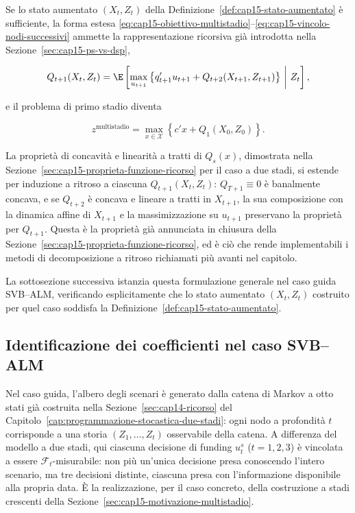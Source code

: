 Se lo stato aumentato $(X_t,Z_t)$ della
Definizione~\ref{def:cap15-stato-aumentato} \`e sufficiente, la forma estesa
\eqref{eq:cap15-obiettivo-multistadio}--\eqref{eq:cap15-vincolo-nodi-successivi}
ammette la rappresentazione ricorsiva gi\`a introdotta nella
Sezione~\ref{sec:cap15-ps-vs-dsp},

\[
Q_{t+1}(X_t,Z_t)
=
\E
\left[
\max_{u_{t+1}}
\left\{
q_{t+1}'u_{t+1}
+
Q_{t+2}(X_{t+1},Z_{t+1})
\right\}
\ \middle|\
Z_t
\right],
\]

e il problema di primo stadio diventa

\[
z^{\text{multistadio}}
=
\max_{x\in\mathcal X}
\left\{
c'x+Q_1(X_0,Z_0)
\right\}.
\]

\begin{remark}

La propriet\`a di concavit\`a e linearit\`a a tratti di $Q_s(x)$, dimostrata
nella Sezione~\ref{sec:cap15-proprieta-funzione-ricorso} per il caso a due
stadi, si estende per induzione a ritroso a ciascuna $Q_{t+1}(X_t,Z_t)$:
$Q_{T+1}\equiv0$ \`e banalmente concava, e se $Q_{t+2}$ \`e concava e
lineare a tratti in $X_{t+1}$, la sua composizione con la dinamica affine di
$X_{t+1}$ e la massimizzazione su $u_{t+1}$ preservano la propriet\`a per
$Q_{t+1}$. Questa \`e la propriet\`a gi\`a annunciata in chiusura della
Sezione~\ref{sec:cap15-proprieta-funzione-ricorso}, ed \`e ci\`o che rende implementabili i metodi di decomposizione a ritroso richiamati pi\`u avanti nel capitolo.

\end{remark}

La sottosezione successiva istanzia questa formulazione generale nel caso
guida SVB--ALM, verificando esplicitamente che lo stato aumentato
$(X_t,Z_t)$ costruito per quel caso soddisfa la
Definizione~\ref{def:cap15-stato-aumentato}.

\subsection{Identificazione dei coefficienti nel caso SVB--ALM}

Nel caso guida, l'albero degli scenari \`e generato dalla catena di Markov
a otto stati gi\`a costruita nella Sezione~\ref{sec:cap14-ricorso} del
Capitolo~\ref{cap:programmazione-stocastica-due-stadi}: ogni nodo a
profondit\`a $t$ corrisponde a una storia $(Z_1,\ldots,Z_t)$ osservabile
della catena. A differenza del modello a due stadi, qui ciascuna decisione
di funding $u_t^s$ ($t=1,2,3$) \`e vincolata a essere $\mathcal
F_t$-misurabile: non pi\`u un'unica decisione presa conoscendo l'intero
scenario, ma tre decisioni distinte, ciascuna presa con l'informazione
disponibile alla propria data. \`E la realizzazione, per il caso concreto,
della costruzione a stadi crescenti della
Sezione~\ref{sec:cap15-motivazione-multistadio}.

